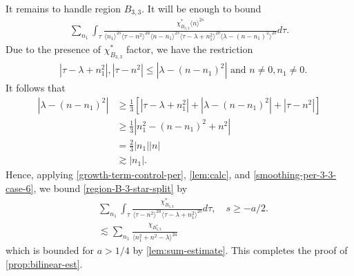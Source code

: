 \documentclass[12pt,reqno]{amsart}
\numberwithin{equation}{section}  %
\begin{document}
%
%
It remains to handle region $B_{3,3}$. It will be enough to bound
%
%
\begin{equation}
  \label{region-B-3-star-split}
\begin{split}
   \sum_{n_{1}} \int_{\tau} \frac{\chi^{*}_{B_{3,3}}
    \langle n \rangle ^{2s}
    }{ \langle n_{1} \rangle^{2s} \langle  \tau  - n^{2}
    \rangle ^{2a}  \langle
n-n_{1} \rangle ^{2s}  \langle  \tau - \lambda+n_{1}^{2}
\rangle^{2b} \langle   \lambda  -(n - n_{1})^{2}
\rangle^{2b} } d \tau.
\end{split}
\end{equation}
%
Due to the presence of $\chi^{*}_{B_{3,3}}$ factor, we have the restriction
%
%
\begin{equation*}
\begin{split}
& |\tau - \lambda +n_{1}^2|, | \tau - n^{2} | \le |  \lambda -
(n - n_{1})^{2} | \text{ and }  n \neq 0, n_1 \neq 0.
\end{split}
\end{equation*}
%
It follows that
\begin{equation}
  \label{smoothing-per-3-3-case-6}
\begin{split}
  | \lambda - (n - n_{1})^{2} |
  & \ge \frac{1}{3}\left[ | \tau - \lambda + n_{1}^{2} | + | \lambda - (n - n_{1})^{2}
  | + | \tau - n^{2} | \right]
  \\
  & \ge \frac{1}{3} |  n_{1}^{2} - (n - n_{1})^{2} + n^{2} |
  \\
  & = \frac{2}{3} | n_{1} | | n |
  \\
  & \gtrsim | n_{1} |.
\end{split}
\end{equation}
Hence, applying
\eqref{growth-term-control-per}, \cref{lem:calc}, and
\eqref{smoothing-per-3-3-case-6}, we bound \eqref{region-B-3-star-split} by
%
%
\begin{equation*}
\begin{split}
   & \sum_{n_{1}} \int_{\tau} \frac{\chi^{*}_{B_{3,3}}
    }{ \langle  \tau  - n^{2}
    \rangle ^{2a}   \langle  \tau - \lambda+n_{1}^{2}
\rangle^{2b} } d \tau, \quad s \ge -a/2.
\\
& \lesssim  \sum_{n_{1}} \frac{\chi_{B_{3,3}^{*}}}{\langle n_{1}^{2} +
n^{2} - \lambda \rangle^{2a }}
\end{split}
\end{equation*}
which is bounded for $a > 1/4$ by
\cref{lem:sum-estimate}. This completes the proof of
\cref{prop:bilinear-est}. \qquad \qedsymbol
%

%
%
%
%
%
\end{document}
